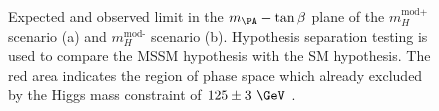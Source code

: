 \begin{figure}[tbh]
\caption{Expected and observed limit in the $m_{\PA}-\tan\beta$ plane of the
$m_H^{\text{mod+}}$ scenario (a) and $m_H^{\text{mod-}}$ scenario (b). Hypothesis
separation testing is used to compare the \ac{MSSM} hypothesis with the \ac{SM}
hypothesis. The red area indicates the region of phase space which already
excluded by the Higgs mass constraint of $125\pm3~\GeV$ \cite{HIG-13-021}.}
\label{fig:mhmodpmhmodm}
\end{figure}

